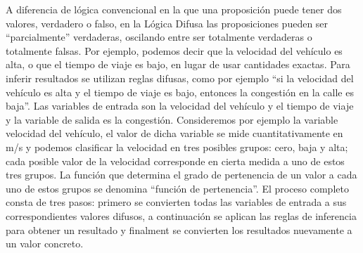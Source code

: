 \documentclass[final,fmstyle]{fpunathesis}
\begin{document}
A diferencia de lógica convencional en la que una proposición puede tener dos valores, verdadero o falso, en la Lógica Difusa las proposiciones pueden ser “parcialmente” verdaderas, oscilando entre ser totalmente verdaderas o totalmente falsas. Por ejemplo, podemos decir que la velocidad del vehículo es alta, o que el tiempo de viaje es bajo, en lugar de usar cantidades exactas. Para inferir resultados se utilizan reglas difusas, como por ejemplo “si la velocidad del vehículo es alta y el tiempo de viaje es bajo, entonces la congestión en la calle es baja”. Las variables de entrada son la velocidad del vehículo y el tiempo de viaje y la variable de salida es la congestión. Consideremos por ejemplo la variable velocidad del vehículo, el valor de dicha variable se mide cuantitativamente en m/s y podemos clasificar la velocidad en tres posibles grupos: cero, baja y alta; cada posible valor de la velocidad corresponde en cierta medida a uno de estos tres grupos. La función  que determina el grado de pertenencia de un valor a cada uno de estos grupos se denomina “función de pertenencia”. El proceso completo consta de tres pasos: primero se convierten todas las variables de entrada a sus correspondientes valores difusos, a continuación se aplican las reglas de inferencia para obtener un resultado y finalment se convierten los resultados nuevamente a un valor concreto.
\end{document}
